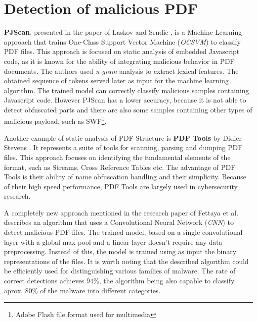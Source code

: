 

\section{Detection of malicious PDF}
\label{section:relatedWorkML}
\textbf{PJScan}, presented in the paper of Laskov and Srndic \cite{pjscan}, is a Machine Learning approach that trains One-Class Support Vector Machine (\textit{OCSVM}) to classify PDF files. This approach is focused on static analysis of embedded Javascript code, as it is known for the ability of integrating malicious behavior in PDF documents. The authors used \textit{n-gram} analysis to extract lexical features. The obtained sequence of tokens served later as input for the machine learning algorithm. The trained model can correctly classify malicious samples containing Javascript code. However PJScan has a lower accuracy, because it is not able to detect obfuscated parts and there are also some samples containing other types of malicious payload, such as SWF\footnote{Adobe Flash file format used for multimedia}. \par
Another example of static analysis of PDF Structure is \textbf{PDF Tools} by Didier Stevens \cite{pdftools}. It represents a suite of tools for scanning, parsing and dumping PDF files. This approach focuses on identifying the fundamental elements of the format, such as Streams, Cross Reference Tables etc. The advantage of PDF Tools is their ability of name obfuscation handling and their simplicity. Because of their high speed performance, PDF Tools are largely used in cybersecurity research. \par
A completely new approach mentioned in the research paper of Fettaya et al. \cite{deepdf} describes an algorithm that uses a Convolutional Neural Network (\textit{CNN}) to detect malicious PDF files. The trained model, based on a single convolutional layer with a global max pool and a linear layer doesn't require any data preprocessing. Instead of this, the model is trained using as input the binary representations of the files. It is worth noting that the described algorithm could be efficiently used for distinguishing various families of malware. The rate of correct detections achieves 94\%, the algorithm being also capable to classify aprox. 80\% of the malware into different categories.